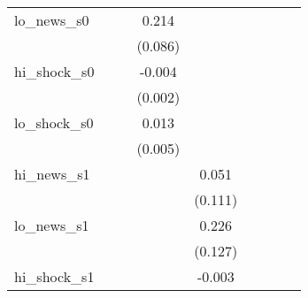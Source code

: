 {\begin{tabular}{l*{8}{c}}
\addlinespace
lo\_news\_s0  &                     &                     &       0.214\sym{**} &                     &                     &                     &                     &                     \\
            &                     &                     &     (0.086)         &                     &                     &                     &                     &                     \\
\addlinespace
hi\_shock\_s0 &                     &                     &      -0.004\sym{*}  &                     &                     &                     &                     &                     \\
            &                     &                     &     (0.002)         &                     &                     &                     &                     &                     \\
\addlinespace
lo\_shock\_s0 &                     &                     &       0.013\sym{**} &                     &                     &                     &                     &                     \\
            &                     &                     &     (0.005)         &                     &                     &                     &                     &                     \\
\addlinespace
hi\_news\_s1  &                     &                     &                     &       0.051         &                     &                     &                     &                     \\
            &                     &                     &                     &     (0.111)         &                     &                     &                     &                     \\
\addlinespace
lo\_news\_s1  &                     &                     &                     &       0.226\sym{*}  &                     &                     &                     &                     \\
            &                     &                     &                     &     (0.127)         &                     &                     &                     &                     \\
\addlinespace
hi\_shock\_s1 &                     &                     &                     &      -0.003         &                     &                     &                     &                     \\

\end{tabular}}
